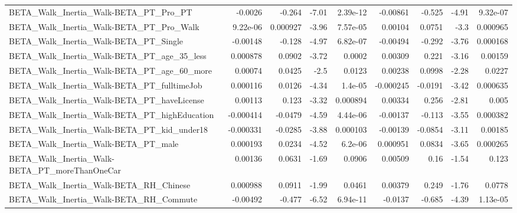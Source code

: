 \begin{tabular}{lrrrrrrrr}
BETA\_Walk\_Inertia\_Walk-BETA\_PT\_Pro\_PT              &     -0.0026 &       -0.264 &    -7.01 & 2.39e-12 &   -0.00861 &      -0.525 &        -4.91 &      9.32e-07 \\
BETA\_Walk\_Inertia\_Walk-BETA\_PT\_Pro\_Walk            &    9.22e-06 &     0.000927 &    -3.96 & 7.57e-05 &    0.00104 &      0.0751 &         -3.3 &      0.000965 \\
BETA\_Walk\_Inertia\_Walk-BETA\_PT\_Single              &    -0.00148 &       -0.128 &    -4.97 & 6.82e-07 &   -0.00494 &      -0.292 &        -3.76 &      0.000168 \\
BETA\_Walk\_Inertia\_Walk-BETA\_PT\_age\_35\_less         &    0.000878 &       0.0902 &    -3.72 &   0.0002 &    0.00309 &       0.221 &        -3.16 &       0.00159 \\
BETA\_Walk\_Inertia\_Walk-BETA\_PT\_age\_60\_more         &     0.00074 &       0.0425 &     -2.5 &   0.0123 &    0.00238 &      0.0998 &        -2.28 &        0.0227 \\
BETA\_Walk\_Inertia\_Walk-BETA\_PT\_fulltimeJob         &    0.000116 &       0.0126 &    -4.34 &  1.4e-05 &  -0.000245 &     -0.0191 &        -3.42 &      0.000635 \\
BETA\_Walk\_Inertia\_Walk-BETA\_PT\_haveLicense         &     0.00113 &        0.123 &    -3.32 & 0.000894 &    0.00334 &       0.256 &        -2.81 &         0.005 \\
BETA\_Walk\_Inertia\_Walk-BETA\_PT\_highEducation       &   -0.000414 &      -0.0479 &    -4.59 & 4.44e-06 &   -0.00137 &      -0.113 &        -3.55 &      0.000382 \\
BETA\_Walk\_Inertia\_Walk-BETA\_PT\_kid\_under18         &   -0.000331 &      -0.0285 &    -3.88 & 0.000103 &   -0.00139 &     -0.0854 &        -3.11 &       0.00185 \\
BETA\_Walk\_Inertia\_Walk-BETA\_PT\_male                &    0.000193 &       0.0234 &    -4.52 &  6.2e-06 &   0.000951 &      0.0834 &        -3.65 &      0.000265 \\
BETA\_Walk\_Inertia\_Walk-BETA\_PT\_moreThanOneCar      &     0.00136 &       0.0631 &    -1.69 &   0.0906 &    0.00509 &        0.16 &        -1.54 &         0.123 \\
BETA\_Walk\_Inertia\_Walk-BETA\_RH\_Chinese             &    0.000988 &       0.0911 &    -1.99 &   0.0461 &    0.00379 &       0.249 &        -1.76 &        0.0778 \\
BETA\_Walk\_Inertia\_Walk-BETA\_RH\_Commute             &    -0.00492 &       -0.477 &    -6.52 & 6.94e-11 &    -0.0137 &      -0.685 &        -4.39 &      1.13e-05 \\

\end{tabular}
